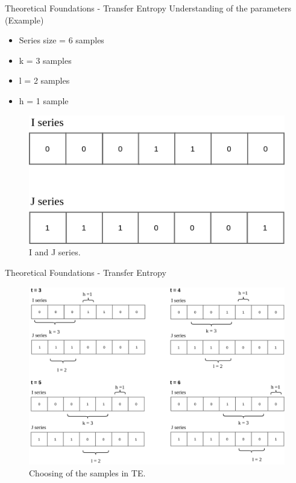 \begin{frame}{Theoretical Foundations - Transfer Entropy}
Understanding of the parameters (Example)
    \begin{itemize}
        \item Series size = 6 samples
        \item k = 3 samples
        \item l = 2 samples
        \item h = 1 sample
        
    \end{itemize}
    
    \begin{figure}[!h]
        \centering
        \includegraphics[scale=0.3]{figuras/series.png}
        \caption{I and J series.}
        \label{fig:series}
    \end{figure}
\end{frame}

\begin{frame}{Theoretical Foundations - Transfer Entropy}

    \begin{figure}[!h]
        \centering
        \includegraphics[scale=0.25]{figuras/te_sim.png}
        \caption{Choosing of the samples in TE.}
        \label{fig:te_sim}
    \end{figure}
\end{frame}

